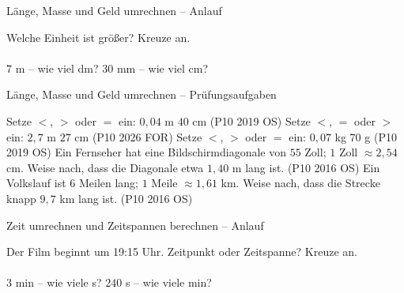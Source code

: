 \setcounter{aufgabe}{52}

\begin{aufgabe}{Länge, Masse und Geld umrechnen – Anlauf}
\begin{teile}
\teil Welche Einheit ist größer? Kreuze an.\\ \\ 
\teil $7$ m – wie viel dm? \leerfeld[dm]
\teil $30$ mm – wie viel cm? \leerfeld[cm]
\end{teile}
\end{aufgabe}

\begin{aufgabe}{Länge, Masse und Geld umrechnen – Prüfungsaufgaben}
\begin{teile}
\teil Setze $<$, $>$ oder $=$ ein: $0{,}04$ m \leerfeld $40$ cm \hfill (P10 2019 OS)
\teil Setze $<$, $=$ oder $>$ ein: $2{,}7$ m \leerfeld $27$ cm \hfill (P10 2026 FOR)
\teil Setze $<$, $>$ oder $=$ ein: $0{,}07$ kg \leerfeld $70$ g \hfill (P10 2019 OS)
\teil Ein Fernseher hat eine Bildschirmdiagonale von $55$ Zoll; $1$ Zoll $\approx 2{,}54$ cm. Weise nach, dass die Diagonale etwa $1{,}40$ m lang ist. \hfill (P10 2016 OS)
\teil Ein Volkslauf ist $6$ Meilen lang; $1$ Meile $\approx 1{,}61$ km. Weise nach, dass die Strecke knapp $9{,}7$ km lang ist. \hfill (P10 2016 OS)
\end{teile}
\end{aufgabe}

\begin{aufgabe}{Zeit umrechnen und Zeitspannen berechnen – Anlauf}
\begin{teile}
\teil Der Film beginnt um 19:15 Uhr. Zeitpunkt oder Zeitspanne? Kreuze an.\\ \\ 
\teil $3$ min – wie viele s? \leerfeld[s]
\teil $240$ s – wie viele min? \leerfeld[min]
\end{teile}
\end{aufgabe}

